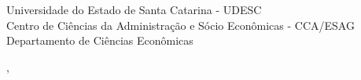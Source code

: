   \begin{capa}%
    \center
	\ABNTEXchapterfont\large{Universidade do Estado de Santa Catarina - UDESC \\ Centro de Ciências da Administra\c c\~ ao e S\' ocio Econ\^omicas - CCA/ESAG \\ Departamento de Ci\^encias Econ\^omicas}

    \vfill
    \ABNTEXchapterfont\bfseries\LARGE\imprimirtitulo
    \vfill

	\ABNTEXchapterfont\large\imprimirautor
	\vfill
%
		
    \large\imprimirlocal, \large\imprimirdata

    \vspace*{1cm}
  \end{capa}
